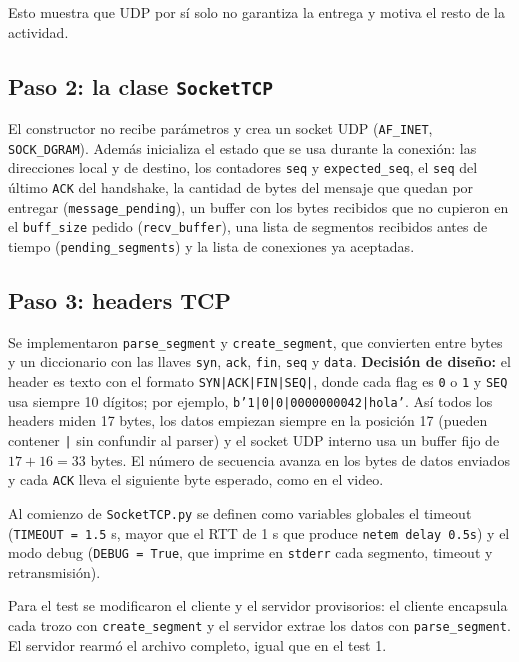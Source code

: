 \documentclass[11pt,letterpaper]{article}
\begin{document}
Esto muestra que UDP por sí solo no garantiza la entrega y motiva el resto de la
actividad.

\subsection{Paso 2: la clase \texttt{SocketTCP}}

El constructor no recibe parámetros y crea un socket UDP (\texttt{AF\_INET},
\texttt{SOCK\_DGRAM}). Además inicializa el estado que se usa durante la conexión: las
direcciones local y de destino, los contadores \texttt{seq} y \texttt{expected\_seq}, el
\texttt{seq} del último \texttt{ACK} del handshake, la cantidad de bytes del mensaje que
quedan por entregar (\texttt{message\_pending}), un buffer con los bytes recibidos que no
cupieron en el \texttt{buff\_size} pedido (\texttt{recv\_buffer}), una lista de segmentos
recibidos antes de tiempo (\texttt{pending\_segments}) y la lista de conexiones ya
aceptadas.

\subsection{Paso 3: headers TCP}

Se implementaron \texttt{parse\_segment} y \texttt{create\_segment}, que convierten entre
bytes y un diccionario con las llaves \texttt{syn}, \texttt{ack}, \texttt{fin},
\texttt{seq} y \texttt{data}. \textbf{Decisión de diseño:} el header es texto con el
formato \texttt{SYN|ACK|FIN|SEQ|}, donde cada flag es \texttt{0} o \texttt{1} y
\texttt{SEQ} usa siempre 10 dígitos; por ejemplo, \texttt{b'1|0|0|0000000042|hola'}.
Así todos los headers miden 17 bytes, los datos empiezan siempre en la posición 17
(pueden contener \texttt{|} sin confundir al parser) y el socket UDP interno usa un buffer
fijo de $17 + 16 = 33$ bytes. El número de secuencia avanza en los bytes de datos
enviados y cada \texttt{ACK} lleva el siguiente byte esperado, como en el video.

Al comienzo de \texttt{SocketTCP.py} se definen como variables globales el timeout
(\texttt{TIMEOUT = 1.5} s, mayor que el RTT de 1 s que produce \texttt{netem delay
0.5s}) y el modo debug (\texttt{DEBUG = True}, que imprime en \texttt{stderr} cada
segmento, timeout y retransmisión).

Para el test se modificaron el cliente y el servidor provisorios: el cliente encapsula
cada trozo con \texttt{create\_segment} y el servidor extrae los datos con
\texttt{parse\_segment}. El servidor rearmó el archivo
completo, igual que en el test 1.
\end{document}
